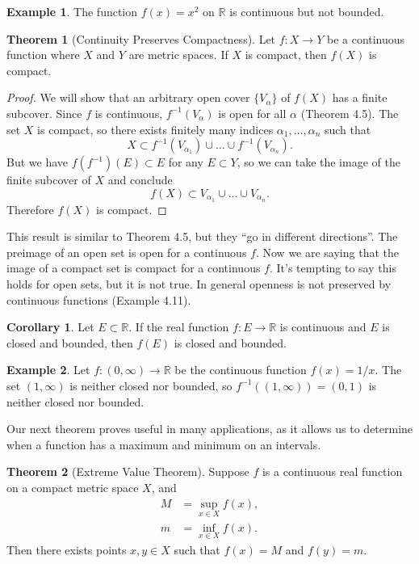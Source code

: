 \documentclass{article}
\newcommand{\R}{\mathbb{R}}
\theoremstyle{definition}
\newtheorem{theorem}{Theorem}[section]
\newtheorem{corollary}{Corollary}[section]
\newtheorem{example}{Example}[section]
\begin{document}
	\begin{example}
		The function $ f(x)=x^2 $ on $ \R $ is continuous but not bounded. 
	\end{example}
	\begin{theorem}[Continuity Preserves Compactness]
		Let $ f:X\to Y $ be a continuous function where $ X $ and $ Y $ are metric spaces. If $ X $ is compact, then $ f(X) $ is compact. 
	\end{theorem}
	\begin{proof}
		We will show that an arbitrary open cover $ \{V_\alpha\} $ of $ f(X) $ has a finite subcover. Since $ f $ is continuous, $ f^{-1}(V_\alpha) $ is open for all $ \alpha $ (Theorem 4.5). The set $ X $ is compact, so there exists finitely many indices $ \alpha_1,\ldots,\alpha_n $ such that $$X\subset f^{-1}(V_{\alpha_1})\cup\ldots\cup f^{-1}(V_{\alpha_n}) .$$ But we have $ f(f^{-1})(E)\subset E $ for any $ E\subset Y $, so we can take the image of the finite subcover of $ X $ and conclude $$ f(X)\subset V_{\alpha_1}\cup\ldots\cup V_{\alpha_n} .$$ Therefore $ f(X) $ is compact. 
	\end{proof}
	This result is similar to Theorem 4.5, but they ``go in different directions''. The preimage of an open set is open for a continuous $ f $. Now we are saying that the image of a compact set is compact for a continuous $ f $. It's tempting to say this holds for open sets, but it is not true. In general openness is not preserved by continuous functions (Example 4.11).
	\begin{corollary}
		Let $ E\subset\R $. If the real function $ f:E\to\R $ is continuous and $ E $ is closed and bounded, then $ f(E) $ is closed and bounded.
	\end{corollary}
	\begin{example}
		Let $ f:(0,\infty)\to\R $ be the continuous function $ f(x)=1/x $. The set $ (1,\infty) $ is neither closed nor bounded, so $ f^{-1}((1,\infty))=(0,1) $ is neither closed nor bounded. 
	\end{example}
	Our next theorem proves useful in many applications, as it allows us to determine when a function has a maximum and minimum on an intervals. 
	\begin{theorem}[Extreme Value Theorem]
		Suppose $ f $ is a continuous real function on a compact metric space $ X $, and \begin{align*}
			M&=\sup\limits_{x\in X}f(x),\\
			m&=\inf\limits_{x\in X}f(x).
		\end{align*}
		Then there exists points $ x,y\in X $ such that $ f(x)=M $ and $ f(y)=m $.
	\end{theorem}
\end{document}
